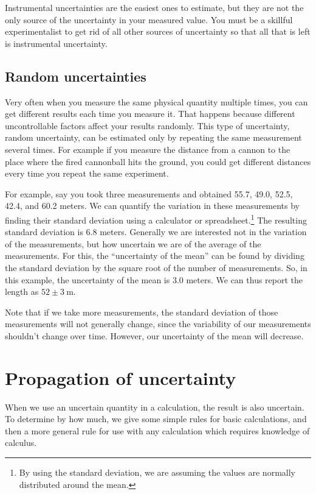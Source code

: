 Instrumental uncertainties are the easiest ones to estimate, but they are not the only source of the uncertainty in your measured value.
You must be a skillful experimentalist to get rid of all other sources of uncertainty so that all that is left is instrumental uncertainty.

\subsection{Random uncertainties}

Very often when you measure the same physical quantity multiple times, you can get different results each time you measure it.
That happens because different uncontrollable factors affect your results randomly.
This type of uncertainty, random uncertainty, can be estimated only by repeating the same measurement several times.
For example if you measure the distance from a cannon to the place where the fired cannonball hits the ground, you could get different distances every time you repeat the same experiment.	
  
For example, say you took three measurements and obtained 55.7, 49.0, 52.5, 42.4, and 60.2 meters. We can quantify the variation in these measurements by finding their standard deviation using a calculator or spreadsheet.\footnote{By using the standard deviation, we are assuming the values are normally distributed around the mean.} The resulting standard deviation is 6.8 meters. Generally we are interested not in the variation of the measurements, but how uncertain we are of the average of the measurements. For this, the ``uncertainty of the mean'' can be found by dividing the standard deviation by the square root of the number of measurements. So, in this example, the uncertainty of the mean is 3.0 meters. We can thus report the length as $52 \pm 3\:$m.

Note that if we take more measurements, the standard deviation of those measurements will not generally change, since the variability of our measurements shouldn't change over time. However, our uncertainty of the mean will decrease.

\section{Propagation of uncertainty}

When we use an uncertain quantity in a calculation, the result is also uncertain. To determine by how much, we give some simple rules for basic calculations, and then a more general rule for use with any calculation which requires knowledge of calculus.


